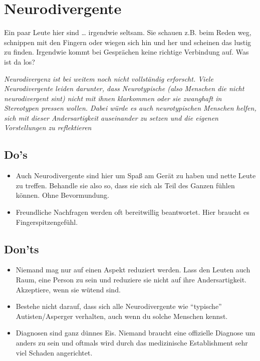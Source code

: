 \documentclass[10pt]{leaflet}
\begin{document}
\section{Neurodivergente}
\label{sec-3}
Ein paar Leute hier sind \ldots{} irgendwie seltsam. Sie schauen
z.B. beim Reden weg, schnippen mit den Fingern oder wiegen sich hin
und her und scheinen das lustig zu finden. Irgendwie kommt bei
Gesprächen keine richtige Verbindung auf. Was ist da los?


\emph{Neurodivergenz ist bei weitem noch nicht vollständig
  erforscht. Viele Neurodivergente leiden darunter, dass Neurotypische
  (also Menschen die nicht neurodivergent sint) nicht mit ihnen
  klarkommen oder sie zwanghaft in Stereotypen pressen wollen. Dabei
  würde es auch neurotypischen Menschen helfen, sich mit dieser
  Andersartigkeit auseinander zu setzen und die eigenen Vorstellungen
  zu reflektieren}

\subsection{Do's}
\label{sec-3-1}
\begin{itemize}
\item Auch Neurodivergente sind hier um Spaß am Gerät zu haben und
  nette Leute zu treffen. Behandle sie also so, dass sie sich als Teil
  des Ganzen fühlen können. Ohne Bevormundung.
\item Freundliche Nachfragen werden oft bereitwillig beantwortet. Hier
  braucht es Fingerspitzengefühl.
\end{itemize}

\subsection{Don'ts}
\label{sec-3-2}
\begin{itemize}
\item Niemand mag nur auf einen Aspekt reduziert werden. Lass den
  Leuten auch Raum, eine Person zu sein und reduziere sie nicht auf
  ihre Andersartigkeit. Akzeptiere, wenn sie wütend sind.
\item Bestehe nicht darauf, dass sich alle Neurodivergente wie
  ``typische'' Autisten/Asperger verhalten, auch wenn du solche
  Menschen kennst.
\item Diagnosen sind ganz dünnes Eis. Niemand braucht eine offizielle
  Diagnose um anders zu sein und oftmals wird durch das medizinische
  Establishment sehr viel Schaden angerichtet.
\end{itemize}
\end{document}
